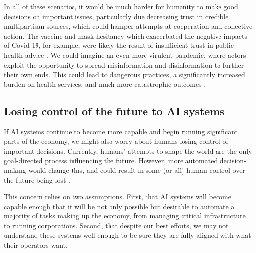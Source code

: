 \documentclass{article}
\begin{document}
In all of these scenarios, it would be much harder for humanity to make good decisions on important issues, particularly due decreasing trust in credible multipartisan sources, which could hamper attempts at cooperation and collective action. The vaccine and mask hesitancy which exacerbated the negative impacts of Covid-19, for example, were likely the result of insufficient trust in public health advice \citep{seger_greatest_2021}. We could imagine an even more virulent pandemic, where actors exploit the opportunity to spread misinformation and disinformation to further their own ends. This could lead to dangerous practices, a significantly increased burden on health services, and much more catastrophic outcomes  \citep{seger_tackling_2020}.

\subsection{Losing control of the future to AI systems}

If AI systems continue to become more capable and begin running significant parts of the economy, we might also worry about humans losing control of important decisions. Currently, humans’ attempts to shape the world are the only goal-directed process influencing the future. However, more automated decision-making would change this, and could result in some (or all) human control over the future being lost \citep{christiano_what_2019,critch_what_2021,ngo_agi_2020,russell_human_2019}.

This concern relies on two assumptions. First, that AI systems will become capable enough that it will be not only possible but desirable to automate a majority of tasks making up the economy, from managing critical infrastructure to running corporations. Second, that despite our best efforts, we may not understand these systems well enough to be sure they are fully aligned with what their operators want.
\end{document}
